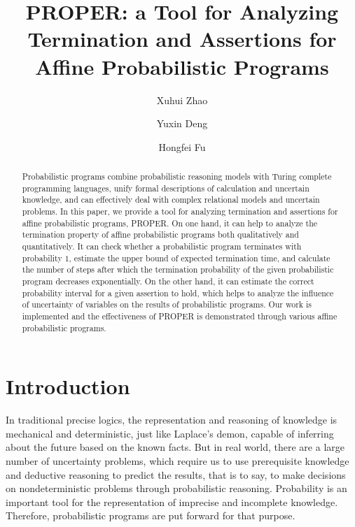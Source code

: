 \documentclass[runningheads]{llncs}
\begin{document}
%
\title{PROPER: a Tool for Analyzing Termination and Assertions for Affine Probabilistic Programs}
%
%
\author{Xuhui Zhao\and
Yuxin Deng %
\and
Hongfei Fu}
%
%
%
\maketitle              %
%
\begin{abstract}
Probabilistic programs combine probabilistic reasoning models with Turing complete programming languages, unify formal descriptions of calculation and uncertain knowledge, and can effectively deal with complex relational models and uncertain problems. In this paper, we provide a tool for analyzing termination and assertions for affine probabilistic programs, PROPER. On one hand, it can help to analyze the termination property of affine probabilistic programs both qualitatively and quantitatively. It can check whether a probabilistic program terminates with probability $1$, estimate the upper bound of expected termination time, and calculate the number of steps after which the termination probability of the given probabilistic program decreases exponentially.  On the other hand, it can estimate the correct probability interval for a given assertion to hold, which helps to analyze the influence of uncertainty of variables on the results of probabilistic programs. Our work is implemented and the effectiveness of PROPER is demonstrated through various affine probabilistic programs.

\end{abstract}
%
%
%
\section{Introduction}
In traditional precise logics, the representation and reasoning of knowledge is mechanical and deterministic, just like Laplace's demon, capable of inferring about the future based on the known facts. But in real world, there are a large number of uncertainty problems, which require us to use prerequisite knowledge and deductive reasoning to predict the results, that is to say, to make decisions on nondeterministic problems through probabilistic reasoning. Probability is an important tool for the representation of imprecise and incomplete knowledge. Therefore, probabilistic programs are put forward for that purpose. 
\end{document}
